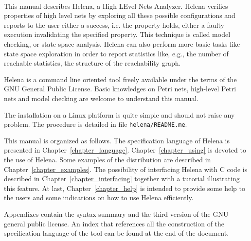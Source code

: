 \begin{minipage}{\textwidth}
\begin{minipage}{0.1\textwidth}
~
\end{minipage}
\begin{minipage}{0.8\textwidth}
This manual describes Helena, a High LEvel Nets Analyzer.  Helena
verifies properties of high level nets by exploring all these possible
configurations and reports to the user either a success, i.e.  the
property holds, either a faulty execution invalidating the specified
property.  This technique is called model checking, or state space
analysis.  Helena can also perform more basic tasks like state space
exploration in order to report statistics like, e.g., the number of
reachable statistics, the structure of the reachability graph.

Helena is a command line oriented tool freely available under the
terms of the GNU General Public License.  Basic knowledges on Petri
nets, high-level Petri nets and model checking are welcome to
understand this manual.

The installation on a Linux platform is quite simple and should not
raise any problem.  The procedure is detailed in
file \texttt{helena/README.me}.

This manual is organized as follows.  The specification language of
Helena is presented in Chapter~\ref{chapter_language}.
Chapter~\ref{chapter_using} is devoted to the use of Helena.  Some
examples of the distribution are described in
Chapter~\ref{chapter_examples}.  The possibility of interfacing Helena
with C code is described in Chapter~\ref{chapter_interfacing} together
with a tutorial illustrating this feature.  At last,
Chapter~\ref{chapter_help} is intended to provide some help to the
users and some indications on how to use Helena efficiently.

Appendixes contain the syntax summary and the third version of the GNU
general public license.  An index that references all the construction
of the specification language of the tool can be found at the end of
the document.
\end{minipage}
\end{minipage}
